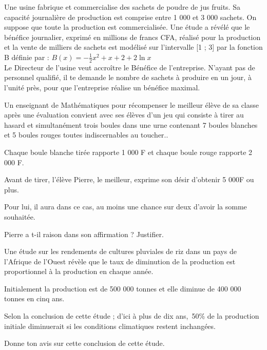 \begin{exercice}
Une usine fabrique et commercialise des sachets de
poudre de jus fruits. Sa capacité journalière de
production est comprise entre 1 000 et 3 000
sachets. On suppose que toute la production est
commercialisée. Une étude a révélé que le bénéfice
journalier, exprimé en millions de francs CFA,
réalisé pour la production et la vente de milliers
de sachets est modélisé sur l'intervalle
[1 ; 3] par la fonction B définie par :\;
$ B(x)= -\frac{1}{2}x^2+x+2+2\ln x$\\
Le Directeur de l'usine veut accroître le Bénéfice
de l'entreprise. N'ayant pas de personnel qualifié,
il te demande le nombre de sachets à produire en
un jour, à l'unité près, pour que l'entreprise réalise
un bénéfice maximal.
\end{exercice}
\begin{exercice}
 Un enseignant de Mathématiques pour récompenser le meilleur élève de sa classe après une évaluation convient avec ses élèves d'un jeu qui consiste à tirer  au hasard et simultanément trois  boules dans une urne   contenant 7 boules blanches et 5 boules rouges toutes indiscernables au toucher.. 
 

 Chaque   boule blanche tirée  rapporte 1 000 F et
chaque boule rouge rapporte 2 000 F.


\medskip
\noindent Avant de tirer, l'élève Pierre, le meilleur,  
exprime son
désir d'obtenir   5 000F  ou plus.


\medskip
\noindent Pour lui, il aura dans ce cas, au moins une chance sur deux
d'avoir la somme  souhaitée.

\medskip
\noindent  Pierre a t-il  raison dans son affirmation ?  Justifier.
\end{exercice}
\begin{exercice}
Une étude sur les rendements de cultures pluviales de riz dans un pays de l'Afrique de l'Ouest révèle que le taux de diminution de la production est proportionnel à la production en chaque année.

\medskip

Initialement la production est de 500 000 tonnes et elle diminue de 400 000 tonnes en cinq ans.

\medskip

Selon la conclusion de cette étude ; d'ici à plus de dix ans,\, 50\% de la production initiale diminuerait si les conditions climatiques restent inchangées.

\medskip
Donne ton avis sur cette conclusion de cette étude.
\end{exercice}
